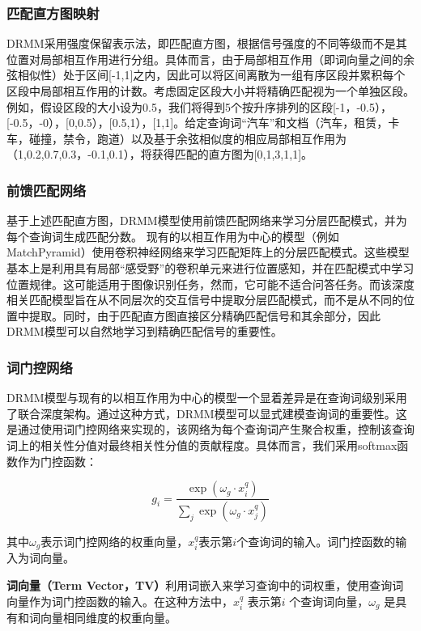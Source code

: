 \documentclass[a4paper]{article}
\begin{document}
\subsubsection{匹配直方图映射}

DRMM采用强度保留表示法，即匹配直方图，根据信号强度的不同等级而不是其位置对局部相互作用进行分组。具体而言，由于局部相互作用（即词向量之间的余弦相似性）处于区间[-1,1]之内，因此可以将区间离散为一组有序区段并累积每个区段中局部相互作用的计数。考虑固定区段大小并将精确匹配视为一个单独区段。例如，假设区段的大小设为0.5，我们将得到5个按升序排列的区段{[-1，-0.5），[-0.5，-0），[0,0.5），[0.5,1），[1,1]}。给定查询词“汽车”和文档（汽车，租赁，卡车，碰撞，禁令，跑道）以及基于余弦相似度的相应局部相互作用为（1,0.2,0.7,0.3，-0.1,0.1），将获得匹配的直方图为[0,1,3,1,1]。

\subsubsection{前馈匹配网络}

基于上述匹配直方图，DRMM模型使用前馈匹配网络来学习分层匹配模式，并为每个查询词生成匹配分数。
现有的以相互作用为中心的模型（例如MatchPyramid\cite{pang2016study}）使用卷积神经网络来学习匹配矩阵上的分层匹配模式。这些模型基本上是利用具有局部“感受野”的卷积单元来进行位置感知，并在匹配模式中学习位置规律。这可能适用于图像识别任务，然而，它可能不适合问答任务。而该深度相关匹配模型旨在从不同层次的交互信号中提取分层匹配模式，而不是从不同的位置中提取。同时，由于匹配直方图直接区分精确匹配信号和其余部分，因此DRMM模型可以自然地学习到精确匹配信号的重要性。

\subsubsection{词门控网络}
DRMM模型与现有的以相互作用为中心的模型一个显着差异是在查询词级别采用了联合深度架构。通过这种方式，DRMM模型可以显式建模查询词的重要性。这是通过使用词门控网络来实现的，该网络为每个查询词产生聚合权重，控制该查询词上的相关性分值对最终相关性分值的贡献程度。具体而言，我们采用softmax函数作为门控函数：

\begin{equation}
    g_i=\frac{\exp(\omega_g\cdot x_i^q)}{\sum_j\exp(\omega_g\cdot x_j^q)}
\end{equation}

其中$\omega_g$表示词门控网络的权重向量，$x_i^q$表示第$i$个查询词的输入。词门控函数的输入为词向量。

\textbf{词向量（Term Vector，TV）}利用词嵌入来学习查询中的词权重，使用查询词向量作为词门控函数的输入。在这种方法中，$x_i^q$  表示第$i$ 个查询词向量，$\omega_g$  是具有和词向量相同维度的权重向量。
 
\end{document}
